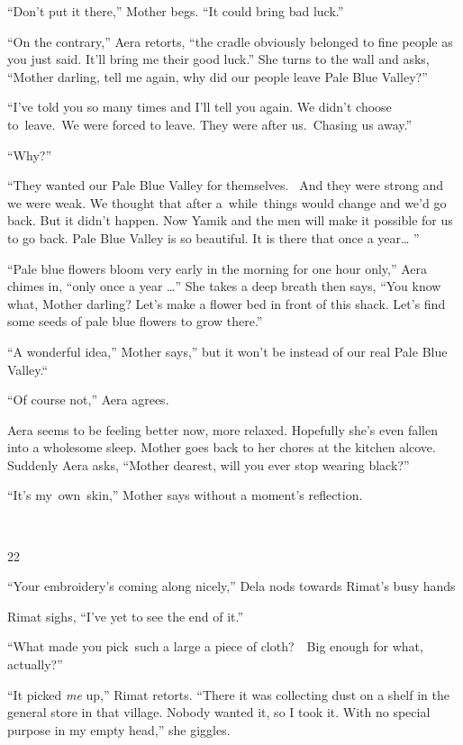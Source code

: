 \documentclass[twoside,11pt]{book}
\begin{document}
``Don't put it there,'' Mother begs. ``It could bring bad luck.'' 

``On the contrary,'' Aera retorts, ``the cradle obviously belonged to fine people
as you just said. It'll bring me their good luck.'' She turns to the wall and asks, ``Mother
darling, tell me again, why did our people leave Pale Blue Valley?'' 

``I've told you so many times and I'll tell you again. We didn't choose to\ leave.\ We were forced to
leave. They were after us.\ Chasing us away.'' 

``Why?'' 

``They wanted our Pale Blue Valley for themselves. ~And they were strong and we were weak. We thought that
after  a\ while\ things would change and we'd go back. But it didn't happen. Now Yamik and the men will make it
possible for us to go back. Pale Blue Valley is so beautiful. It is there that once a year{\dots} '' 

 ``Pale blue flowers bloom very early in the morning for one hour only,'' Aera chimes in, ``only once a
year {\dots}'' She takes a deep breath then says, ``You know what, Mother darling? Let's make
a flower bed in front of this shack. Let's find some seeds of pale blue flowers to grow there.''

``A wonderful idea,'' Mother says,'' but it won't be instead of our real Pale
Blue Valley.``\ 

``Of course not,'' Aera agrees.

 Aera seems to be feeling better now, more relaxed. Hopefully she's even fallen into a wholesome sleep. Mother goes back
to her chores at the kitchen alcove. Suddenly Aera asks, ``Mother dearest, will you ever stop wearing
black?'' 

``It's my{\ }own\ skin,'' Mother says without a moment's reflection. 

~

22~~

``Your embroidery's coming along nicely,'' Dela nods towards Rimat's busy hands

Rimat sighs, ``I've yet to see the end of it.'' 

``What made you pick~such a large a piece of cloth?\ \ Big enough for what, actually?''

``It picked \textit{me} up,'' Rimat retorts. ``There it was collecting dust on a
shelf in the general store in that village. Nobody wanted it, so I took it. With no special purpose in my empty
head,'' she giggles.
\end{document}
